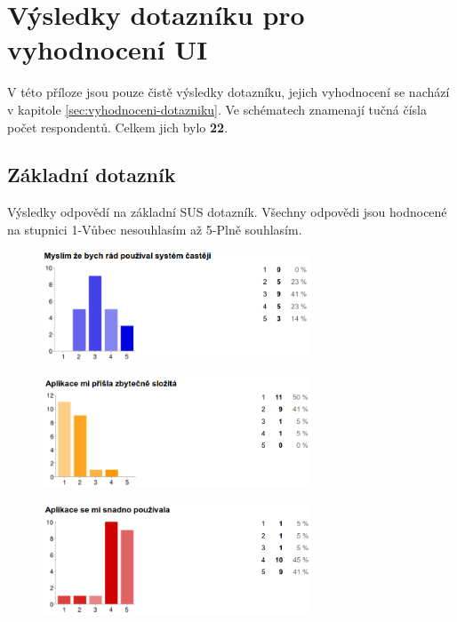 \chapter{Výsledky dotazníku pro vyhodnocení UI}
\label{chp:vysledky}
V této příloze jsou pouze čistě výsledky dotazníku, jejich vyhodnocení se nachází v kapitole \ref{sec:vyhodnoceni-dotazniku}. Ve schématech znamenají tučná čísla počet respondentů. Celkem jich bylo \textbf{22}.

\section{Základní dotazník}
Výsledky odpovědí na základní SUS dotazník.
Všechny odpovědi jsou hodnocené na stupnici 1-Vůbec nesouhlasím až 5-Plně souhlasím.

\begin{figure}[H]
\begin{center}
\includegraphics[width=80mm]{./pictures/dotaznik/sus-01.png}
\label{fig:dot:sus-01}
\end{center}
\end{figure}

\begin{figure}[H]
\begin{center}
\includegraphics[width=80mm]{./pictures/dotaznik/sus-02.png}
\label{fig:dot:sus-02}
\end{center}
\end{figure}

\begin{figure}[H]
\begin{center}
\includegraphics[width=80mm]{./pictures/dotaznik/sus-03.png}
\label{fig:dot:sus-03}
\end{center}
\end{figure}

